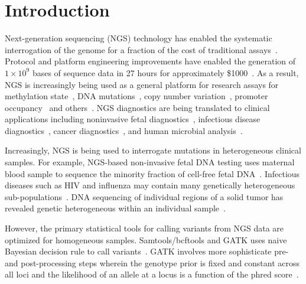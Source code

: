 \documentclass{bioinfo}
\begin{document}
\section{Introduction}
\label{sec:intro}
Next-generation sequencing (NGS) technology has enabled the systematic interrogation of the genome for a fraction of the cost of traditional assays~\citep{Koboldt:2013kw}. Protocol and platform engineering improvements have enabled the generation of $1\times10^9$ bases of sequence data in 27 hours for approximately \$1000~\citep{Quail:2012hf}. As a result, NGS is increasingly being used as a general platform for research assays for methylation state~\citep{Laird:2010ab}, DNA mutations~\citep{Consortium:2013co}, copy number variation~\citep{Alkan:2009cr}, promoter occupancy~\citep{Ouyang:2009hc} and others~\citep{Rivera:2013ee}. NGS diagnostics are being translated to clinical applications including noninvasive fetal diagnostics~\citep{Kitzman:2012hea}, infectious disease diagnostics~\citep{Capobianchi:2012em}, cancer diagnostics~\citep{Navin:2010gu}, and human microbial analysis~\citep{Consortium:2013iz}.

Increasingly, NGS is being used to interrogate mutations in heterogeneous clinical samples. For example, NGS-based non-invasive fetal DNA testing uses maternal blood sample to sequence the minority fraction of cell-free fetal DNA~\citep{Fan:2008di}. Infectious diseases such as HIV and influenza may contain many genetically heterogeneous sub-populations~\citep{Flaherty:2011ja, Ghedin:2010ie}. DNA sequencing of individual regions of a solid tumor has revealed genetic heterogeneous within an individual sample~\citep{Navin:2010gu}.

However, the primary statistical tools for calling variants from NGS data are optimized for homogeneous samples. Samtools/bcftools and GATK uses naive Bayesian decision rule to call variants~\citep{li2011statistical, depristo2011framework}. GATK involves more sophisticate pre- and post-processing steps wherein the genotype prior is fixed and constant across all loci and the likelihood of an allele at a locus is a function of the phred score~\citep{McKenna:2010bv}.
\end{document}

